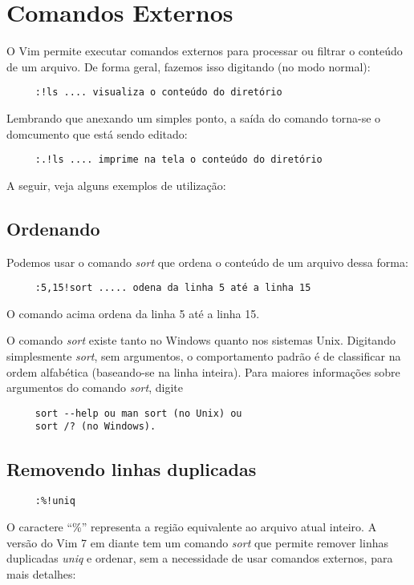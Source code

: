 \chapter{Comandos Externos}
O Vim permite executar comandos externos para processar ou filtrar o
conteúdo de um arquivo. De forma geral, fazemos isso digitando (no
modo normal):

\begin{verbatim}
     :!ls .... visualiza o conteúdo do diretório
\end{verbatim}

Lembrando que anexando um simples ponto, a saída do comando torna-se o 
domcumento que está sendo editado:

\begin{verbatim}
     :.!ls .... imprime na tela o conteúdo do diretório
\end{verbatim}

A seguir, veja alguns exemplos de utilização:

\section{Ordenando}
Podemos usar o comando {\em sort} que ordena o conteúdo de um arquivo dessa forma:

\begin{verbatim}
     :5,15!sort ..... odena da linha 5 até a linha 15
\end{verbatim}

O comando acima ordena da linha 5 até a linha 15.

O comando {\em sort} existe tanto no Windows quanto nos sistemas Unix.
Digitando simplesmente {\em sort}, sem argumentos, o comportamento padrão
é de classificar na ordem alfabética (baseando-se na linha inteira).
Para maiores informações sobre argumentos do comando {\em sort}, digite

\begin{verbatim}
     sort --help ou man sort (no Unix) ou
     sort /? (no Windows).
\end{verbatim}

\section{Removendo linhas duplicadas}

\begin{verbatim}
     :%!uniq
\end{verbatim}

O caractere ``\%'' representa a região equivalente ao arquivo atual inteiro.
A versão do Vim 7 em diante tem um comando {\em sort} que permite remover
linhas duplicadas {\em uniq} e ordenar, sem a necessidade de usar comandos
externos, para mais detalhes:

